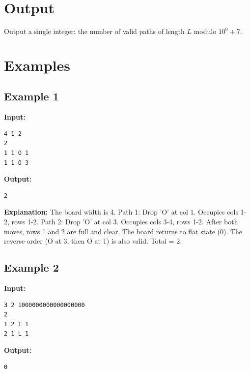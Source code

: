 \documentclass[11pt, letterpaper]{article}
\begin{document}
\section*{Output}

Output a single integer: the number of valid paths of length $L$ modulo $10^9 + 7$.

\section*{Examples}

\subsection*{Example 1}
\textbf{Input:}
\begin{verbatim}
4 1 2
2
1 1 O 1
1 1 O 3
\end{verbatim}

\textbf{Output:}
\begin{verbatim}
2
\end{verbatim}

\textbf{Explanation:}
The board width is 4.
Path 1: Drop 'O' at col 1. Occupies cols 1-2, rows 1-2.
Path 2: Drop 'O' at col 3. Occupies cols 3-4, rows 1-2.
After both moves, rows 1 and 2 are full and clear. The board returns to flat state (0).
The reverse order (O at 3, then O at 1) is also valid. Total = 2.

\subsection*{Example 2}
\textbf{Input:}
\begin{verbatim}
3 2 1000000000000000000
2
1 2 I 1
2 1 L 1
\end{verbatim}

\textbf{Output:}
\begin{verbatim}
0
\end{verbatim}
\end{document}
